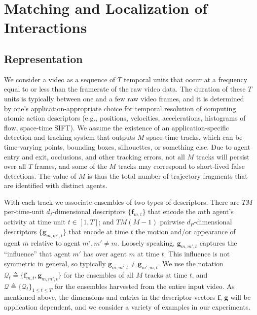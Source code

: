 \section{Matching and Localization of Interactions}

\vspace{-5pt}

\subsection{Representation}

\vspace{-5pt}

We consider a video as a sequence of $T$ temporal units that occur at a frequency equal to or less than the framerate of the raw video data. The duration of these $T$ units is typically between one and a  few raw video frames, and it is determined by one's application-appropriate choice for temporal resolution of computing atomic action descriptors (e.g., positions, velocities, accelerations, histograms of flow, space-time SIFT). We assume the existence of an application-specific detection and tracking system that outputs $M$ space-time tracks, which can be time-varying points, bounding boxes, silhouettes, or something else. Due to agent entry and exit, occlusions, and other tracking errors, not all $M$ tracks will persist over all $T$ frames, and some of the $M$ tracks may correspond to short-lived false detections.  The value of $M$ is thus the total number of trajectory fragments that are identified with distinct agents.

With each track we associate ensembles of two types of descriptors. There are $TM$ per-time-unit $d_{I}$-dimensional descriptors $\{\mathbf{f}_{m,t}\}$ that encode the $m$th agent's activity at time unit $t\in[1, T]$; and $TM(M-1)$ pairwise $d_{P}$-dimensional descriptors $\{\mathbf{g}_{m,m',t}\}$ that encode at time $t$ the motion and/or appearance of agent $m$ relative to agent $m', m'\ne m$. Loosely speaking, $\mathbf{g}_{m,m',t}$ captures the ``influence'' that agent $m'$ has over agent $m$ at time $t$. This influence is not symmetric in general, so typically $\mathbf{g}_{m,m',t}\ne \mathbf{g}_{m',m,t}$.  We use the notation $\mathcal{Q}_{t}\triangleq\{\mathbf{f}_{m,t},\mathbf{g}_{m,m',t}\}$ for the ensembles of all $M$ tracks at time $t$, and $\mathcal{Q}\triangleq\{\mathcal{Q}_{t}\}_{1\leq t\leq T}$ for the ensembles harvested from the entire input video. As mentioned above, the dimensions and entries in the descriptor vectors $\mathbf{f}$, $\mathbf{g}$ will be application dependent, and we consider a variety of examples in our experiments.

